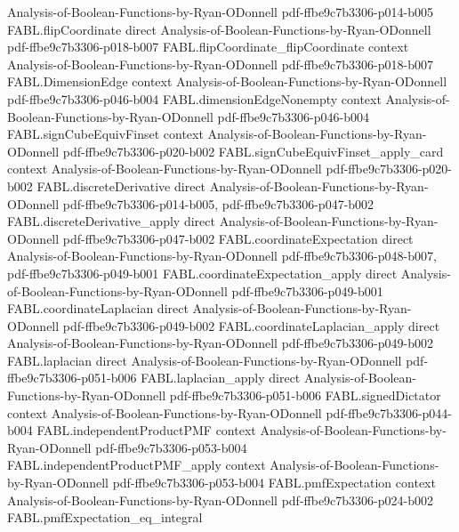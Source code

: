 \begin{theorem}
  {Analysis-of-Boolean-Functions-by-Ryan-ODonnell}
  {pdf-ffbe9c7b3306-p014-b005}
\proofstep
  {FABL.flipCoordinate}
  {direct}
  {Analysis-of-Boolean-Functions-by-Ryan-ODonnell}
  {pdf-ffbe9c7b3306-p018-b007}
\proofstep
  {FABL.flipCoordinate_flipCoordinate}
  {context}
  {Analysis-of-Boolean-Functions-by-Ryan-ODonnell}
  {pdf-ffbe9c7b3306-p018-b007}
\proofstep
  {FABL.DimensionEdge}
  {context}
  {Analysis-of-Boolean-Functions-by-Ryan-ODonnell}
  {pdf-ffbe9c7b3306-p046-b004}
\proofstep
  {FABL.dimensionEdgeNonempty}
  {context}
  {Analysis-of-Boolean-Functions-by-Ryan-ODonnell}
  {pdf-ffbe9c7b3306-p046-b004}
\proofstep
  {FABL.signCubeEquivFinset}
  {context}
  {Analysis-of-Boolean-Functions-by-Ryan-ODonnell}
  {pdf-ffbe9c7b3306-p020-b002}
\proofstep
  {FABL.signCubeEquivFinset_apply_card}
  {context}
  {Analysis-of-Boolean-Functions-by-Ryan-ODonnell}
  {pdf-ffbe9c7b3306-p020-b002}
\proofstep
  {FABL.discreteDerivative}
  {direct}
  {Analysis-of-Boolean-Functions-by-Ryan-ODonnell}
  {pdf-ffbe9c7b3306-p014-b005,
    pdf-ffbe9c7b3306-p047-b002}
\proofstep
  {FABL.discreteDerivative_apply}
  {direct}
  {Analysis-of-Boolean-Functions-by-Ryan-ODonnell}
  {pdf-ffbe9c7b3306-p047-b002}
\proofstep
  {FABL.coordinateExpectation}
  {direct}
  {Analysis-of-Boolean-Functions-by-Ryan-ODonnell}
  {pdf-ffbe9c7b3306-p048-b007,
    pdf-ffbe9c7b3306-p049-b001}
\proofstep
  {FABL.coordinateExpectation_apply}
  {direct}
  {Analysis-of-Boolean-Functions-by-Ryan-ODonnell}
  {pdf-ffbe9c7b3306-p049-b001}
\proofstep
  {FABL.coordinateLaplacian}
  {direct}
  {Analysis-of-Boolean-Functions-by-Ryan-ODonnell}
  {pdf-ffbe9c7b3306-p049-b002}
\proofstep
  {FABL.coordinateLaplacian_apply}
  {direct}
  {Analysis-of-Boolean-Functions-by-Ryan-ODonnell}
  {pdf-ffbe9c7b3306-p049-b002}
\proofstep
  {FABL.laplacian}
  {direct}
  {Analysis-of-Boolean-Functions-by-Ryan-ODonnell}
  {pdf-ffbe9c7b3306-p051-b006}
\proofstep
  {FABL.laplacian_apply}
  {direct}
  {Analysis-of-Boolean-Functions-by-Ryan-ODonnell}
  {pdf-ffbe9c7b3306-p051-b006}
\proofstep
  {FABL.signedDictator}
  {context}
  {Analysis-of-Boolean-Functions-by-Ryan-ODonnell}
  {pdf-ffbe9c7b3306-p044-b004}
\proofstep
  {FABL.independentProductPMF}
  {context}
  {Analysis-of-Boolean-Functions-by-Ryan-ODonnell}
  {pdf-ffbe9c7b3306-p053-b004}
\proofstep
  {FABL.independentProductPMF_apply}
  {context}
  {Analysis-of-Boolean-Functions-by-Ryan-ODonnell}
  {pdf-ffbe9c7b3306-p053-b004}
\proofstep
  {FABL.pmfExpectation}
  {context}
  {Analysis-of-Boolean-Functions-by-Ryan-ODonnell}
  {pdf-ffbe9c7b3306-p024-b002}
\proofstep
  {FABL.pmfExpectation_eq_integral}

\end{theorem}
